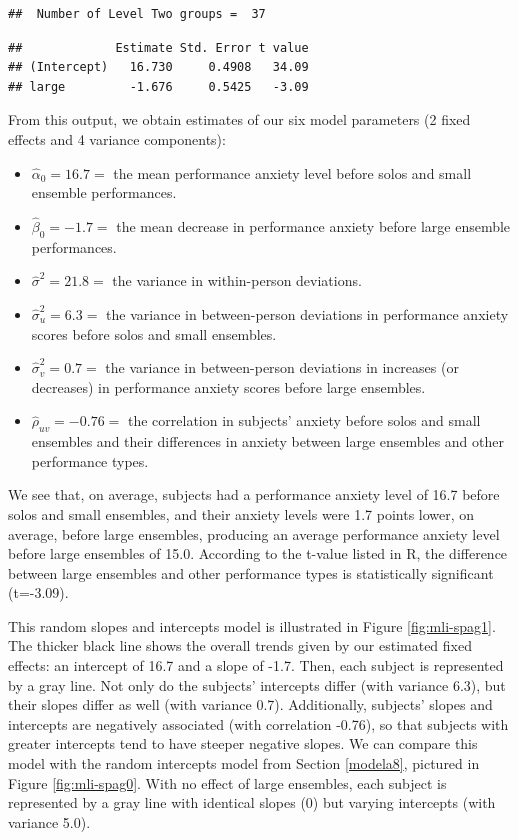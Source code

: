 \documentclass[
]{krantz}
\providecommand{\tightlist}{%
  \setlength{\itemsep}{0pt}\setlength{\parskip}{0pt}}
\begin{document}
\begin{verbatim}
##  Number of Level Two groups =  37
\end{verbatim}

\begin{verbatim}
##             Estimate Std. Error t value
## (Intercept)   16.730     0.4908   34.09
## large         -1.676     0.5425   -3.09
\end{verbatim}

From this output, we obtain estimates of our six model parameters (2 fixed effects and 4 variance components):

\begin{itemize}
\tightlist
\item
  \(\hat{\alpha}_{0}=16.7=\) the mean performance anxiety level before solos and small ensemble performances.
\item
  \(\hat{\beta}_{0}=-1.7=\) the mean decrease in performance anxiety before large ensemble performances.
\item
  \(\hat{\sigma}^2=21.8=\) the variance in within-person deviations.
\item
  \(\hat{\sigma}_{u}^{2}=6.3=\) the variance in between-person deviations in performance anxiety scores before solos and small ensembles.
\item
  \(\hat{\sigma}_{v}^{2}=0.7=\) the variance in between-person deviations in increases (or decreases) in performance anxiety scores before large ensembles.
\item
  \(\hat{\rho}_{uv}=-0.76=\) the correlation in subjects' anxiety before solos and small ensembles and their differences in anxiety between large ensembles and other performance types.
\end{itemize}

We see that, on average, subjects had a performance anxiety level of 16.7 before solos and small ensembles, and their anxiety levels were 1.7 points lower, on average, before large ensembles, producing an average performance anxiety level before large ensembles of 15.0. According to the t-value listed in R, the difference between large ensembles and other performance types is statistically significant (t=-3.09).

This random slopes and intercepts model is illustrated in Figure \ref{fig:mli-spag1}. The thicker black line shows the overall trends given by our estimated fixed effects: an intercept of 16.7 and a slope of -1.7. Then, each subject is represented by a gray line. Not only do the subjects' intercepts differ (with variance 6.3), but their slopes differ as well (with variance 0.7). Additionally, subjects' slopes and intercepts are negatively associated (with correlation -0.76), so that subjects with greater intercepts tend to have steeper negative slopes. We can compare this model with the random intercepts model from Section \ref{modela8}, pictured in Figure \ref{fig:mli-spag0}. With no effect of large ensembles, each subject is represented by a gray line with identical slopes (0) but varying intercepts (with variance 5.0).
\end{document}
